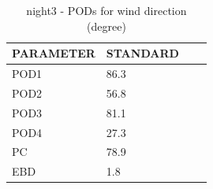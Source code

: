 \begin{table}[p!]
\begin{center}
\begin{tabular}{|l|l|l|l|}
\hline
\multicolumn{1}{|c|}{\cellcolor[HTML]{C0C0C0}\textbf{PARAMETER}} & \multicolumn{1}{c|}{\cellcolor[HTML]{C0C0C0}\textbf{STANDARD}}\\
\hline
\cellcolor[HTML]{C0C0C0}POD1  & 86.3      \\
\cellcolor[HTML]{C0C0C0}POD2  & 56.8      \\
\cellcolor[HTML]{C0C0C0}POD3  & 81.1      \\
\cellcolor[HTML]{C0C0C0}POD4  & 27.3      \\
\cellcolor[HTML]{C0C0C0}PC    & 78.9        \\
\cellcolor[HTML]{C0C0C0}EBD   & 1.8       \\
\hline
\end{tabular}
\caption{night3 - PODs for wind direction (degree)}
\label{tab:podwd:night3}
\end{center}
\end{table}
